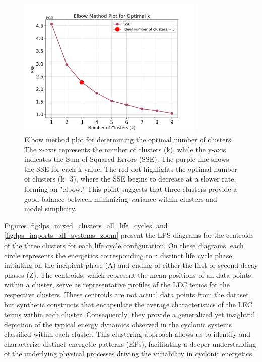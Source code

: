 \begin{figure}[!htbp]
\centering
\includegraphics[width=0.8\textwidth]{figs_6/elbow_method_plot.png}
\caption[Elbow Method]{Elbow method plot for determining the optimal number of clusters. The x-axis represents the number of clusters (k), while the y-axis indicates the Sum of Squared Errors (SSE). The purple line shows the SSE for each k value. The red dot highlights the optimal number of clusters (k=3), where the SSE begins to decrease at a slower rate, forming an "elbow." This point suggests that three clusters provide a good balance between minimizing variance within clusters and model simplicity.}
\label{fig:elbow_method_plot}
\end{figure}

Figures \ref{fig:lps_mixed_clusters_all_life_cycles} and \ref{fig:lps_imports_all_systems_zoom} present the LPS diagrams for the centroids of the three clusters for each life cycle configuration. On these diagrams, each circle represents the energetics corresponding to a distinct life cycle phase, initiating on the incipient phase (A) and ending of either the first or second decay phases (Z). The centroids, which represent the mean positions of all data points within a cluster, serve as representative profiles of the LEC terms for the respective clusters. These centroids are not actual data points from the dataset but synthetic constructs that encapsulate the average characteristics of the LEC terms within each cluster. Consequently, they provide a generalized yet insightful depiction of the typical energy dynamics observed in the cyclonic systems classified within each cluster. This clustering approach allows us to identify and characterize distinct energetic patterns (EPs), facilitating a deeper understanding of the underlying physical processes driving the variability in cyclonic energetics.

